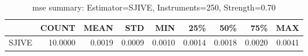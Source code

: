 \begin{table}[ht]
\centering
\caption{mse summary: Estimator=SJIVE, Instruments=250, Strength=0.70}
\begin{tabular}{lrrrrrrrr}
\toprule
 & COUNT & MEAN & STD & MIN & 25\% & 50\% & 75\% & MAX \\
\midrule
SJIVE & 10.0000 & 0.0019 & 0.0009 & 0.0010 & 0.0014 & 0.0018 & 0.0020 & 0.0041 \\
\bottomrule
\end{tabular}
\end{table}
